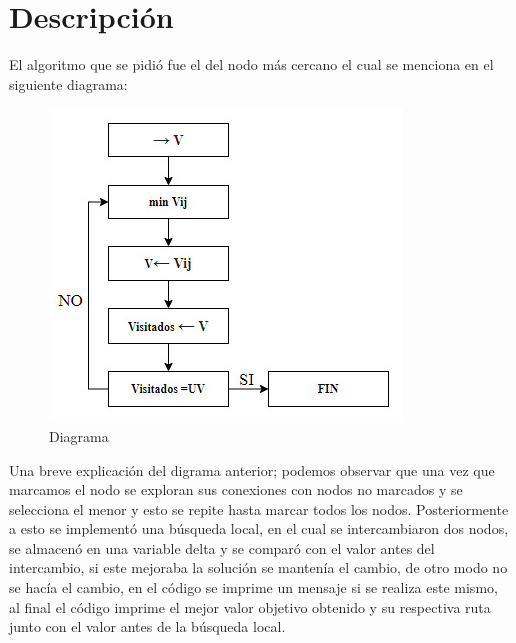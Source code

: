 \documentclass[12pt,a4paper]{article}
\begin{document}
\section{Descripción}
 El algoritmo que se pidió fue el del nodo más cercano el cual se menciona en el siguiente diagrama:
 \begin{figure}[ht]
    \centering
    \includegraphics[scale = 0.5]{diagrama.jpeg}
    \caption{Diagrama}     
 \end{figure}
 \newpage Una breve explicación del digrama anterior; podemos observar que una vez que marcamos el nodo se exploran sus conexiones con nodos no marcados y se selecciona el menor y esto se repite hasta marcar todos los nodos.
 \newline Posteriormente a esto se implementó una búsqueda local, en el cual se intercambiaron dos nodos, se almacenó en una variable delta y se comparó con el valor antes del intercambio, si este mejoraba la solución se mantenía el cambio, de otro modo no se hacía el cambio, en el código
 se imprime un mensaje si se realiza este mismo, al final el código imprime el mejor valor objetivo obtenido y su respectiva ruta junto con el valor antes de la búsqueda local.  
\end{document}
